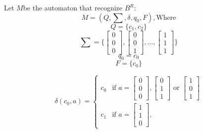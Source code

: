 \documentclass[9pt,tikz,border=2mm]{article}
\begin{document}
\begin{enumerate}
\begin{enumerate}
            Let $M$be the automaton that recognize $B^R$:
                \[ M = (Q,\sum,\delta,q_0,F), \text{Where}\]
                \[ Q=\{c_1,c_2\}\]
                \[ \sum=\{
                    \begin{bmatrix}
                        0\\
                        0\\
                        0
                    \end{bmatrix},
                    \begin{bmatrix}
                        0\\
                        0\\
                        1
                    \end{bmatrix},...,
                    \begin{bmatrix}
                        1\\
                        1\\
                        1
                    \end{bmatrix}
                \}\]
                \[q_0 = c_0\]
                \[F = \{c_0\}\]

                
                \[\delta(c_0,a)=
                    \begin{cases}
                        c_0 & \text{if } a =\begin{bmatrix}
                            0\\
                            0\\
                            0
                        \end{bmatrix},
                        \begin{bmatrix}
                            0\\
                            1\\
                            1
                        \end{bmatrix} \text{ or }
                        \begin{bmatrix}
                            1\\
                            0\\
                            1
                        \end{bmatrix}\\
                        c_1 & \text{if } a =\begin{bmatrix}
                            1\\
                            1\\
                            0
                        \end{bmatrix},
                    \end{cases}
                \]


\end{enumerate}
\end{enumerate}
\end{document}
